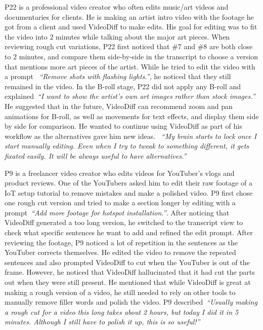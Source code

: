 P22 is a professional video creator who often edits music/art videos and documentaries for clients. He is making an artist intro video with the footage he got from a client and used VideoDiff to make edits. His goal for editing was to fit the video into 2 minutes while talking about the major art pieces. 
When reviewing rough cut variations, P22 first noticed that \#7 and \#8 are both close to 2 minutes, and compare them side-by-side in the transcript to choose a version that mentions more art pieces of the artist.
While he tried to edit the video with a prompt ~\textit{``Remove shots with flashing lights.''}, he noticed that they still remained in the video.
In the B-roll stage, P22 did not apply any B-roll and explained~\textit{``I want to show the artist's own art images rather than stock images.''} He suggested that in the future, VideoDiff can recommend zoom and pan animations for B-roll, as well as movements for text effects, and display them side by side for comparison.
He wanted to continue using VideoDiff as part of his workflow as the alternatives gave him new ideas. ~\textit{``My brain starts to lock once I start manually editing. Even when I try to tweak to something different, it gets fixated easily. It will be always useful to have alternatives.''}





P9 is a freelancer video creator who edits videos for YouTuber's vlogs and product reviews. One of the YouTubers asked him to edit their raw footage of a IoT setup tutorial to remove mistakes and make a polished video. 
P9 first chose one rough cut version and tried to make a section longer by editing with a prompt~\textit{``Add more footage for hotspot installation.''}. After noticing that VideoDiff generated a too long version, he switched to the transcript view to check what specific sentences he want to add and refined the edit prompt. 
After reviewing the footage, P9 noticed a lot of repetition in the sentences as the YouTuber corrects themselves. 
He edited the video to remove the repeated sentences and also prompted VideoDiff to cut when the YouTuber is out of the frame. However, he noticed that VideoDiff hallucinated that it had cut the parts out when they were still present.
He mentioned that while VideoDiff is great at making a rough version of a video, he still needed to rely on other tools to manually remove filler words and polish the video. P9 described~\textit{``Usually making a rough cut for a video this long takes about 2 hours, but today I did it in 5 minutes. Although I still have to polish it up, this is so useful!'' }


